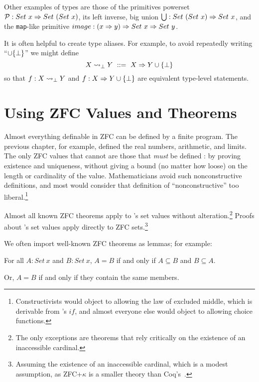 Other examples of types are those of the \lzfclang primitives powerset $\mathcal{P} : Set~x \Rightarrow Set~(Set~x)$, its left inverse, big union $\textstyle\bigcup : Set~(Set~x) \Rightarrow Set~x$, and the \texttt{map}-like primitive $image : (x \Rightarrow y) \Rightarrow Set~x \Rightarrow Set~y$.

It is often helpful to create type aliases.
For example, to avoid repeatedly writing ``$\cup \{{\bot}\}$'' we might define
\begin{equation}
	X \rightsquigarrow_\bot Y\ ::=\ X \Rightarrow Y \cup \{{\bot}\}
\end{equation}
so that $f : X \rightsquigarrow_\bot Y$ and $f : X \Rightarrow Y \cup \{{\bot}\}$ are equivalent type-level statements.


\section{Using ZFC Values and Theorems}

Almost everything definable in ZFC can be defined by a finite \lzfclang program.
The previous chapter, for example, defined the real numbers, arithmetic, and limits.
The only ZFC values that cannot are those that \emph{must} be defined : by proving existence and uniqueness, without giving a bound (no matter how loose) on the length or cardinality of the value.
Mathematicians avoid such nonconstructive definitions, and most would consider that definition of ``nonconstructive'' too liberal.\footnote{Constructivists would object to allowing the law of excluded middle, which is derivable from \lzfclang's $if$, and almost everyone else would object to allowing choice functions.}

Almost all known ZFC theorems apply to \lzfclang's set values without alteration.\footnote{The only exceptions are theorems that rely critically on the existence of an inaccessible cardinal.}
Proofs about \lzfclang's set values apply directly to ZFC sets.\footnote{Assuming the existence of an inaccessible cardinal, which is a modest assumption, as ZFC+$\kappa$ is a smaller theory than Coq's~\cite{cit:barras-2010-sets-coq}.}

We often import well-known ZFC theorems as lemmas; for example:

\begin{lemma}
\label{lem:set-equality-extensional}
For all $A : Set~x$ and $B : Set~x$, $A = B$ if and only if $A \subseteq B$ and $B \subseteq A$.
\end{lemma}
Or, $A = B$ if and only if they contain the same members.

